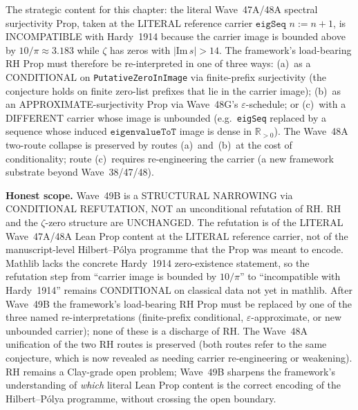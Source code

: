 \begin{remark}
The strategic content for this chapter: the literal Wave~47A/48A spectral surjectivity Prop, taken at the LITERAL reference carrier $\texttt{eigSeq } n := n + 1$, is INCOMPATIBLE with Hardy~1914 because the carrier image is bounded above by $10/\pi \approx 3.183$ while $\zeta$ has zeros with $|\mathrm{Im}\,s| > 14$. The framework's load-bearing RH Prop must therefore be re-interpreted in one of three ways: (a)~as a CONDITIONAL on \texttt{PutativeZeroInImage} via finite-prefix surjectivity (the conjecture holds on finite zero-list prefixes that lie in the carrier image); (b)~as an APPROXIMATE-surjectivity Prop via Wave~48G's $\varepsilon$-schedule; or (c)~with a DIFFERENT carrier whose image is unbounded (e.g.~\texttt{eigSeq} replaced by a sequence whose induced $\texttt{eigenvalueToT}$ image is dense in $\mathbb{R}_{> 0}$). The Wave~48A two-route collapse is preserved by routes (a)~and~(b)~at the cost of conditionality; route (c)~requires re-engineering the carrier (a new framework substrate beyond Wave~38/47/48).

\textbf{Honest scope.} Wave~49B is a STRUCTURAL NARROWING via CONDITIONAL REFUTATION, NOT an unconditional refutation of RH. RH and the $\zeta$-zero structure are UNCHANGED. The refutation is of the LITERAL Wave~47A/48A Lean Prop content at the LITERAL reference carrier, not of the manuscript-level Hilbert--P\'olya programme that the Prop was meant to encode. Mathlib lacks the concrete Hardy~1914 zero-existence statement, so the refutation step from ``carrier image is bounded by $10/\pi$'' to ``incompatible with Hardy~1914'' remains CONDITIONAL on classical data not yet in mathlib. After Wave~49B the framework's load-bearing RH Prop must be replaced by one of the three named re-interpretations (finite-prefix conditional, $\varepsilon$-approximate, or new unbounded carrier); none of these is a discharge of RH. The Wave~48A unification of the two RH routes is preserved (both routes refer to the same conjecture, which is now revealed as needing carrier re-engineering or weakening). RH remains a Clay-grade open problem; Wave~49B sharpens the framework's understanding of \emph{which} literal Lean Prop content is the correct encoding of the Hilbert--P\'olya programme, without crossing the open boundary.
\end{remark}

